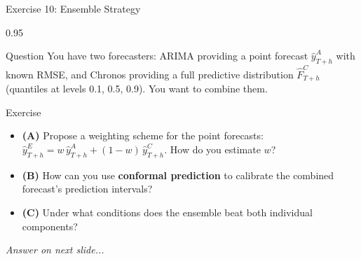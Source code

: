 \documentclass[9pt, aspectratio=169, t]{beamer}
\begin{document}
\begin{frame}{Exercise 10: Ensemble Strategy}
    \begin{cminipage}{0.95\textwidth}
    \begin{alertblock}{Question}
        You have two forecasters: ARIMA providing a point forecast $\hat{y}^{A}_{T+h}$ with known RMSE, and Chronos providing a full predictive distribution $\hat{F}^{C}_{T+h}$ (quantiles at levels 0.1, 0.5, 0.9). You want to combine them.
    \end{alertblock}

    \vspace{0.15cm}

    \begin{block}{Exercise}
        \begin{itemize}\setlength{\itemsep}{3pt}
            \item \textcolor{MainBlue}{\textbf{(A)}} Propose a weighting scheme for the point forecasts: $\hat{y}^{E}_{T+h} = w\,\hat{y}^{A}_{T+h} + (1-w)\,\hat{y}^{C}_{T+h}$. How do you estimate $w$?
            \item \textcolor{MainBlue}{\textbf{(B)}} How can you use \textbf{conformal prediction} to calibrate the combined forecast's prediction intervals?
            \item \textcolor{MainBlue}{\textbf{(C)}} Under what conditions does the ensemble beat both individual components?
        \end{itemize}
    \end{block}

    \vspace{0.15cm}

    \begin{center}
        \textit{Answer on next slide...}
    \end{center}
    \end{cminipage}
\end{frame}
\end{document}
